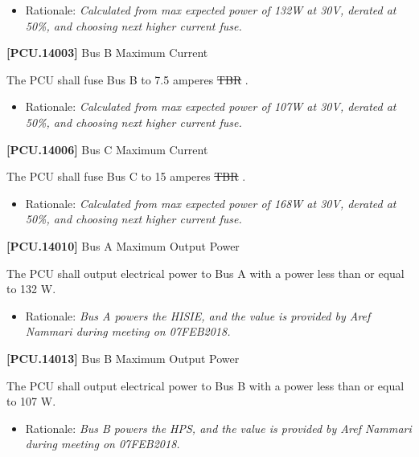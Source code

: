 \documentclass[12pt,oneside,oldfontcommands]{memoir}
\providecommand{\DIFaddtex}[1]{{\protect\color{blue}\uwave{#1}}} %
\providecommand{\DIFdeltex}[1]{{\protect\color{red}\sout{#1}}}                      %
\providecommand{\DIFaddbegin}{} %
\providecommand{\DIFaddend}{} %
\providecommand{\DIFdelbegin}{} %
\providecommand{\DIFdelend}{} %
\providecommand{\DIFadd}[1]{\texorpdfstring{\DIFaddtex{#1}}{#1}} %
\providecommand{\DIFdel}[1]{\texorpdfstring{\DIFdeltex{#1}}{}} %
\newcommand{\DIFscaledelfig}{0.5}
\newlength{\DIFdelgraphicswidth} %
\newlength{\DIFdelgraphicsheight} %
\newcommand{\DIFaddincludegraphics}[2][]{{\color{blue}\fbox{\DIFOincludegraphics[#1]{#2}}}} %
\newcommand{\DIFdelincludegraphics}[2][]{%
\sbox{\DIFdelgraphicsbox}{\DIFOincludegraphics[#1]{#2}}%
\settoboxwidth{\DIFdelgraphicswidth}{\DIFdelgraphicsbox} %
\settoboxtotalheight{\DIFdelgraphicsheight}{\DIFdelgraphicsbox} %
\scalebox{\DIFscaledelfig}{%
\parbox[b]{\DIFdelgraphicswidth}{\usebox{\DIFdelgraphicsbox}\\[-\baselineskip] \rule{\DIFdelgraphicswidth}{0em}}\llap{\resizebox{\DIFdelgraphicswidth}{\DIFdelgraphicsheight}{%
\setlength{\unitlength}{\DIFdelgraphicswidth}%
\begin{picture}(1,1)%
\thicklines\linethickness{2pt} %
{\color[rgb]{1,0,0}\put(0,0){\framebox(1,1){}}}%
{\color[rgb]{1,0,0}\put(0,0){\line( 1,1){1}}}%
{\color[rgb]{1,0,0}\put(0,1){\line(1,-1){1}}}%
\end{picture}%
}\hspace*{3pt}}} %
} %
\DeclareRobustCommand{\DIFaddbegin}{\DIFOaddbegin \let\includegraphics\DIFaddincludegraphics} %
\DeclareRobustCommand{\DIFaddend}{\DIFOaddend \let\includegraphics\DIFOincludegraphics} %
\DeclareRobustCommand{\DIFdelbegin}{\DIFOdelbegin \let\includegraphics\DIFdelincludegraphics} %
\DeclareRobustCommand{\DIFdelend}{\DIFOaddend \let\includegraphics\DIFOincludegraphics} %
\begin{document}
\begin{itemize}
\item{} Rationale: \emph{Calculated from max expected power of 132W at 30V, derated at 50\%, and choosing next higher current fuse.}

\end{itemize}

\textbf{[PCU.14003]} Bus B Maximum Current

The \gls{PCU} shall fuse Bus B to 7.5 amperes \DIFdelbegin \DIFdel{TBR}%
\DIFdelend \DIFaddbegin \DIFadd{(TBR}\label{tbx_8}\DIFadd{)}\DIFaddend .

\begin{itemize}
\item{} Rationale: \emph{Calculated from max expected power of 107W at 30V, derated at 50\%, and choosing next higher current fuse.}

\end{itemize}

\textbf{[PCU.14006]} Bus C Maximum Current

The \gls{PCU} shall fuse Bus C to 15 amperes \DIFdelbegin \DIFdel{TBR}%
\DIFdelend \DIFaddbegin \DIFadd{(TBR}\label{tbx_9}\DIFadd{)}\DIFaddend .

\begin{itemize}
\item{} Rationale: \emph{Calculated from max expected power of 168W at 30V, derated at 50\%, and choosing next higher current fuse.}

\end{itemize}

\textbf{[PCU.14010]} Bus A Maximum Output Power

The \gls{PCU} shall output electrical power to Bus A with a power less than or equal to 132 W.

\begin{itemize}
\item{} Rationale: \emph{Bus A powers the HISIE, and the value is provided by Aref Nammari during meeting on 07FEB2018.}

\end{itemize}

\textbf{[PCU.14013]} Bus B Maximum Output Power

The \gls{PCU} shall output electrical power to Bus B with a power less than or equal to 107 W.

\begin{itemize}
\item{} Rationale: \emph{Bus B powers the HPS, and the value is provided by Aref Nammari during meeting on 07FEB2018.}

\end{itemize}
\end{document}
